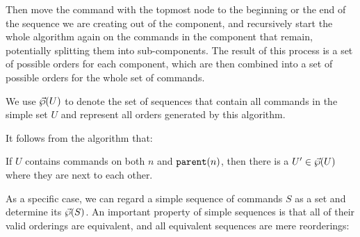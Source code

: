 Then move the command with the topmost node to the beginning or the end of
the sequence we are creating out of the component,
and recursively start the whole algorithm again on the commands in the component that remain,
potentially splitting them into sub-components.
The result of this process is a set of possible orders for each component,
which are then combined into a set of possible orders for the whole set of commands.

\begin{mydef}[$\ordersetsign$]
We use $\vec{\wp}({U})$ to denote the set of sequences that contain all commands in
the simple set $U$
and represent all orders generated by this algorithm.
\end{mydef}

It follows from the algorithm that:
\begin{mycor}\label{lemma:neighbor}
If $U$ contains commands on both $n$ and $\mathtt{parent}(n)$, then
there is a $U'\in\vec{\wp}({U})$ where they are next to each other.
\end{mycor}

As a specific case, we can regard a simple sequence of commands $S$
as a set and determine its $\vec{\wp}({S})$.
An important property of simple sequences is that
all of their valid orderings are equivalent,
and all equivalent sequences are mere reorderings:

